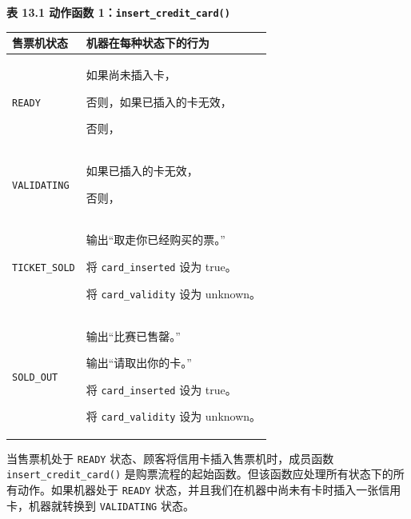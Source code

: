 \begin{center}
{\bfseries 表 13.1 动作函数 1：\texttt{insert\_\allowbreak{}credit\_\allowbreak{}card(\allowbreak{})\allowbreak{}}}\par\vspace{3bp}
\begin{tabularx}{\textwidth}{XX}
\toprule
售票机状态 & 机器在每种状态下的行为 \\
\midrule
\texttt{READY} & 如果尚未插入卡，\par 否则，如果已插入的卡无效，\par 否则， \\
\texttt{VALIDATING} & 如果已插入的卡无效，\par 否则， \\
\texttt{TICKET\_\allowbreak{}SOLD} & 输出“取走你已经购买的票。”\par 将 \texttt{card\_\allowbreak{}inserted} 设为 true。\par 将 \texttt{card\_\allowbreak{}validity} 设为 unknown。 \\
\texttt{SOLD\_OUT} & 输出“比赛已售罄。”\par 输出“请取出你的卡。”\par 将 \texttt{card\_\allowbreak{}inserted} 设为 true。\par 将 \texttt{card\_\allowbreak{}validity} 设为 unknown。 \\
\bottomrule
\end{tabularx}
\end{center}

当售票机处于 \texttt{READY} 状态、顾客将信用卡插入售票机时，成员函数 \texttt{insert\_\allowbreak{}credit\_\allowbreak{}card(\allowbreak{})\allowbreak{}} 是购票流程的起始函数。但该函数应处理所有状态下的所有动作。如果机器处于 \texttt{READY} 状态，并且我们在机器中尚未有卡时插入一张信用卡，机器就转换到 \texttt{VALIDATING} 状态。

